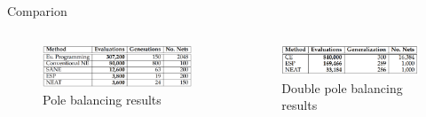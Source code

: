 \documentclass{beamer}
\begin{document}
\begin{frame}{Comparion}
    \begin{columns}
        \begin{column}{0.5\textwidth}
        \begin{figure}[c]
            \includegraphics[width=\textwidth]{img/pole_balancing_table.png}
       \caption{Pole balancing results}
        \end{figure}\end{column}
        \begin{column}{0.5\textwidth}
            \begin{figure}[c]
                \includegraphics[width=\textwidth]{img/double_pole_balancing_table.png}
            \caption{Double pole balancing results}
            \end{figure}
        \end{column}
    \end{columns}
\end{frame}
\end{document}
